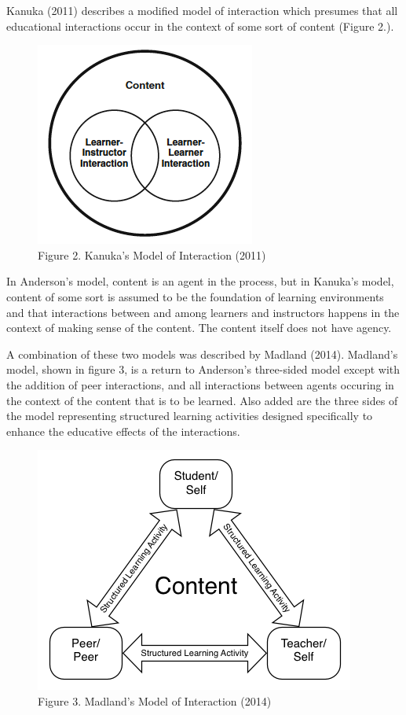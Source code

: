 \documentclass[
]{book}
\begin{document}
Kanuka (2011) describes a modified model of interaction which presumes that all educational interactions occur in the context of some sort of content (Figure 2.).

\begin{figure}
\centering
\includegraphics{assets/u2/Kanuka-Modes-of-Interaction.png}
\caption{Figure 2. Kanuka's Model of Interaction (2011)}
\end{figure}

In Anderson's model, content is an agent in the process, but in Kanuka's model, content of some sort is assumed to be the foundation of learning environments and that interactions between and among learners and instructors happens in the context of making sense of the content. The content itself does not have agency.

A combination of these two models was described by Madland (2014). Madland's model, shown in figure 3, is a return to Anderson's three-sided model except with the addition of peer interactions, and all interactions between agents occuring in the context of the content that is to be learned. Also added are the three sides of the model representing structured learning activities designed specifically to enhance the educative effects of the interactions.

\begin{figure}
\centering
\includegraphics{assets/u2/Modes-of-Interaction-Madland.png}
\caption{Figure 3. Madland's Model of Interaction (2014)}
\end{figure}
\end{document}
